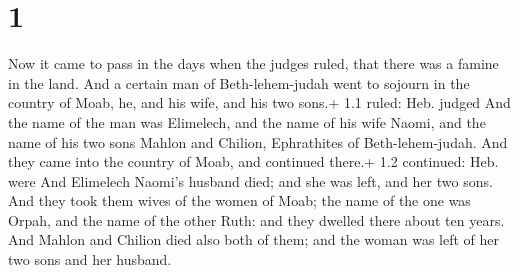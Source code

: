 \hypertarget{section}{%
\section{1}\label{section}}

 Now it came to pass in the days when the judges ruled, that
there was a famine in the land. And a certain man of Beth-lehem-judah
went to sojourn in the country of Moab, he, and his wife, and his two
sons.+ 1.1 ruled: Heb. judged  And the name of the man was
Elimelech, and the name of his wife Naomi, and the name of his two sons
Mahlon and Chilion, Ephrathites of Beth-lehem-judah. And they came into
the country of Moab, and continued there.+ 1.2 continued: Heb. were
 And Elimelech Naomi's husband died; and she was left, and
her two sons.  And they took them wives of the women of
Moab; the name of the one was Orpah, and the name of the other Ruth: and
they dwelled there about ten years.  And Mahlon and Chilion
died also both of them; and the woman was left of her two sons and her
husband.

